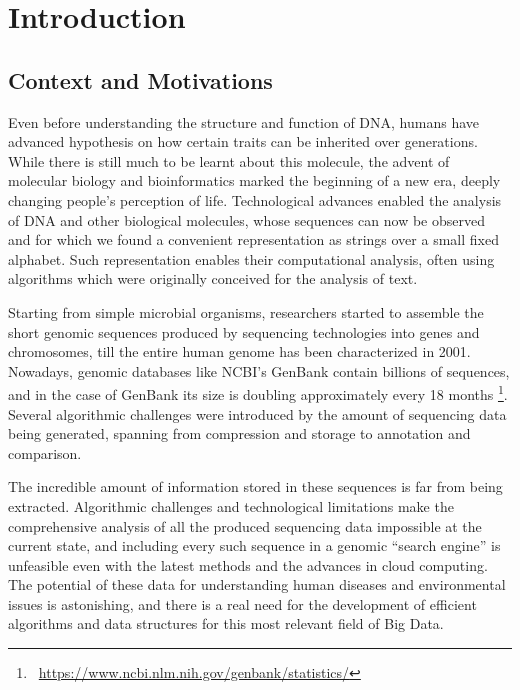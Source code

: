 
\chapter{Introduction}
\label{Chapter1}

\section{Context and Motivations}

Even before understanding the structure and function of DNA, humans have advanced hypothesis on how certain traits can be inherited over generations. While there is still much to be learnt about this molecule, the advent of molecular biology and bioinformatics marked the beginning of a new era, deeply changing people's perception of life. Technological advances enabled the analysis of DNA and other biological molecules, whose sequences can now be observed and for which we found a convenient representation as strings over a small fixed alphabet. Such representation enables their computational analysis, often using algorithms which were originally conceived for the analysis of text.

Starting from simple microbial organisms, researchers started to assemble the short genomic sequences produced by sequencing technologies into genes and chromosomes, till the entire human genome has been characterized in 2001. Nowadays, genomic databases like NCBI's GenBank contain billions of sequences, and in the case of GenBank its size is doubling approximately every 18 months \footnote{~\url{https://www.ncbi.nlm.nih.gov/genbank/statistics/}}. Several algorithmic challenges were introduced by the amount of sequencing data being generated, spanning from compression and storage to annotation and comparison.

The incredible amount of information stored in these sequences is far from being extracted. Algorithmic challenges and technological limitations make the comprehensive analysis of all the produced sequencing data impossible at the current state, and including every such sequence in a genomic ``search engine'' is unfeasible even with the latest methods and the advances in cloud computing. The potential of these data for understanding human diseases and environmental issues is astonishing, and there is a real need for the development of efficient algorithms and data structures for this most relevant field of Big Data.

